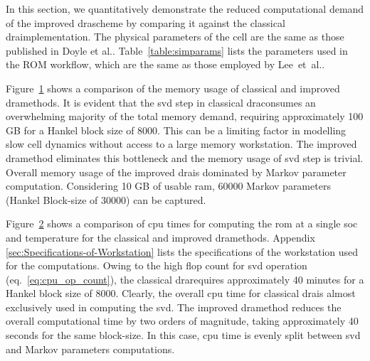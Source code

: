In this section, we quantitatively demonstrate the reduced computational
demand of the improved \gls{dra}scheme by comparing it against the classical
\gls{dra}implementation. The physical parameters of the cell are the same
as those published in Doyle et al.\cite{FullerDoyleNewman1994}.
Table~\ref{table:simparams} lists the parameters used in the ROM
workflow, which are the same as those employed by Lee~et~al.\cite{LeeChemistruckPlett2012}.

\begin{figure}
	\caption{}
	\label{memory}
\end{figure}

Figure~\ref{memory} shows a comparison of the memory usage of
classical and improved \gls{dra}methods. It is evident that the \gls{svd} step
in classical \gls{dra}consumes an overwhelming majority of the total memory
demand, requiring approximately 100 GB for a Hankel block size of
8000. This can be a limiting factor in modelling slow cell dynamics
without access to a large memory workstation. The improved \gls{dra}method
eliminates this bottleneck and the memory usage of \gls{svd} step is trivial.
Overall memory usage of the improved \gls{dra}is dominated by Markov parameter
computation. Considering 10 GB of usable \gls{ram}, 60000 Markov parameters
(Hankel Block-size of 30000) can be captured.

Figure~\ref{cputime} shows a comparison of \gls{cpu} times for computing
the \gls{rom} at a single \gls{soc} and temperature for the classical and improved
\gls{dra}methods. Appendix \ref{sec:Specifications-of-Workstation} lists the specifications
of the workstation used for the computations. Owing to the high flop
count for \gls{svd} operation (eq.~\ref{eq:cpu_op_count}), the classical
\gls{dra}requires approximately 40 minutes for a Hankel block size of 8000.
Clearly, the overall \gls{cpu} time for classical \gls{dra}is almost exclusively
used in computing the \gls{svd}. The improved \gls{dra}method reduces the overall
computational time by two orders of magnitude, taking approximately
40 seconds for the same block-size. In this case, \gls{cpu} time is evenly
split between \gls{svd} and Markov parameters computations.

\begin{figure}
	\caption{}
	\label{cputime}
\end{figure}

